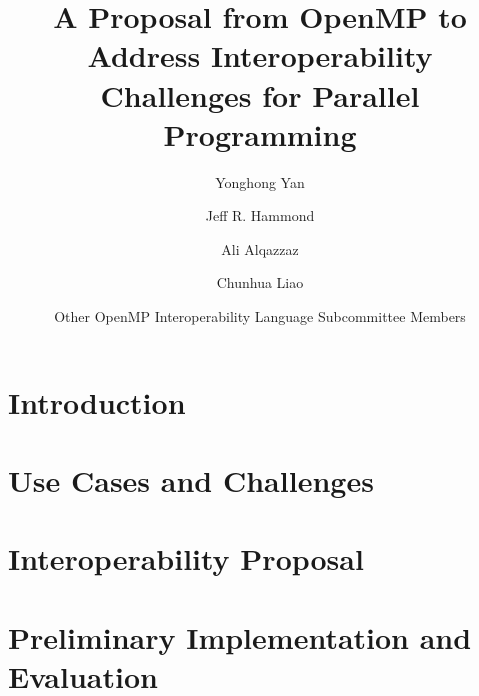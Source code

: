 \documentclass{llncs}
\begin{document}
%
\mainmatter              %
%
\title{A Proposal from OpenMP to Address Interoperability Challenges for Parallel Programming} %
%
\author{
    Yonghong Yan \and
    Jeff R. Hammond \and
    Ali Alqazzaz \and
    Chunhua Liao \and
    Other OpenMP Interoperability Language Subcommittee Members
}

\maketitle              %

\begin{abstract}

\end{abstract}
%

\section{Introduction}
\label{sec:intro}


\section{Use Cases and Challenges}
\label{sec:challenges}


\section{Interoperability Proposal}
\label{sec:proposal}


\section{Preliminary Implementation and Evaluation}
\label{sec:implementation}

\end{document}
